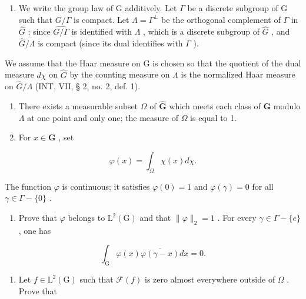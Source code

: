 \begin{enumerate}
\def\labelenumi{\arabic{enumi})}
\setcounter{enumi}{67}
\tightlist
\item
  We write the group law of G additively. Let \(\Gamma\) be a discrete subgroup of G such that \(G / \Gamma\) is compact. Let \(\Lambda = \Gamma^{\perp}\) be the orthogonal complement of \(\Gamma\) in \(\widehat{G}\) ; since \(\widehat{G / \Gamma}\) is identified with \(\Lambda\) , which is a discrete subgroup of \(\widehat{G}\) , and \(\widehat{G} / \Lambda\) is compact (since its dual identifies with \(\Gamma\) ).
\end{enumerate}

We assume that the Haar measure on G is chosen so that the quotient of the dual measure \(d\chi\) on \(\widehat{G}\) by the counting measure on \(\Lambda\) is the normalized Haar measure on \(\widehat{G}/\Lambda\) (INT, VII, § 2, no. 2, def. 1).

\begin{enumerate}
\def\labelenumi{\alph{enumi})}
\item
  There exists a measurable subset \(\Omega\) of \(\widehat{\mathbf{G}}\) which meets each class of \(\mathbf{G}\) modulo \(\Lambda\) at one point and only one; the measure of \(\Omega\) is equal to 1.
\item
  For \(x\in \mathbf{G}\) , set
\end{enumerate}

\[
\varphi (x) = \int_ {\Omega} \chi (x) d \chi .
\]

The function \(\varphi\) is continuous; it satisfies \(\varphi(0) = 1\) and \(\varphi(\gamma) = 0\) for all \(\gamma \in \Gamma - \{0\}\) .

\begin{enumerate}
\def\labelenumi{\alph{enumi})}
\setcounter{enumi}{2}
\tightlist
\item
  Prove that \(\varphi\) belongs to \(\mathrm{L}^2 (\mathrm{G})\) and that \(\| \varphi \| _2 = 1\) . For every \(\gamma \in \Gamma -\{e\}\) , one has
\end{enumerate}

\[
\int_ {\mathrm{G}} \varphi (x) \overline {{\varphi (\gamma - x)}} d x = 0.
\]

\begin{enumerate}
\def\labelenumi{\alph{enumi})}
\setcounter{enumi}{3}
\tightlist
\item
  Let \(f \in \mathrm{L}^{2}(\mathrm{G})\) such that \(\mathcal{F}(f)\) is zero almost everywhere outside of \(\Omega\) . Prove that
\end{enumerate}

